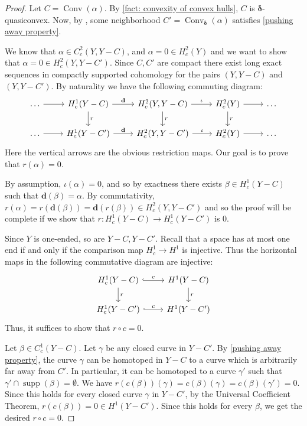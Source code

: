 \documentclass{amsart}
\numberwithin{equation}{section}
\theoremstyle{definition}
\newcommand{\bfd}{\mathbf{d}}
\newcommand{\bdelta}{{\boldsymbol\delta}}
\DeclareMathOperator{\conv}{Conv}
\DeclareMathOperator{\supp}{supp}
\begin{document}
\begin{proof}
Let $C = \conv(\alpha)$. By \ref{fact: convexity of convex hulls}, $C$ is $\bdelta$-quasiconvex. Now, by , some neighborhood $C' = \conv_\bdelta(\alpha)$ satisfies \ref{pushing away property}. 

We know that $\alpha\in C^2_c(Y,Y-C)$, and $\alpha =0 \in H^2_c(Y)$ and we want to show that $\alpha = 0\in H^2_c(Y,Y-C')$. 
Since $C,C'$ are compact there exist long exact sequences in compactly supported cohomology for the pairs $(Y,Y-C)$ and $(Y,Y-C')$. By naturality we have the following commuting diagram:
\begin{equation}
    \begin{tikzcd}
   \dots  \arrow[r] & H^1_c(Y-C) \arrow[r,"\bfd"]\arrow[d,"r"] &H^2_c(Y,Y-C) \arrow[r,"\iota"]\arrow[d,"r"] &H^2_c(Y) \arrow[r]\arrow[d,"r"] &\dots\\
   \dots  \arrow[r] & H^1_c(Y-C') \arrow[r,"\bfd"] &H^2_c(Y,Y-C') \arrow[r,"\iota"] &H^2_c(Y) \arrow[r] &\dots
\end{tikzcd}
\end{equation}
Here the vertical arrows are the obvious restriction maps. 
Our goal is to prove that $r(\alpha)=0$.

By assumption, $\iota(\alpha)=0$, and so by exactness there exists $\beta\in H^1_c(Y-C)$ such that $\bfd(\beta)=\alpha$. By commutativity, 
$r(\alpha) = r(\bfd (\beta)) = \bfd (r (\beta)) \in H^2_c(Y,Y-C')$
and so the proof will be complete if we show that $r:H^1_c(Y-C) \to H^1_c(Y-C')$ is $0$.

Since $Y$ is one-ended, so are $Y-C, Y-C'$. Recall that a space has at most one end if and only if the comparison map $H^1_c \to H^1$ is injective. 
Thus the horizontal maps in the following commutative diagram are injective:
\begin{equation}
    \begin{tikzcd}
        H^1_c (Y-C) \arrow[hookrightarrow]{r}{c}\arrow[d,"r"] &H^1(Y-C) \arrow[d,"r"]\\
        H^1_c (Y-C') \arrow[hookrightarrow]{r}{c} &H^1(Y-C') 
    \end{tikzcd}
\end{equation}
Thus, it suffices to show that $r\circ c =0$.

Let $\beta \in C^1_c(Y-C)$. 
Let $\gamma$ be any closed curve in $Y-C'$.
By \ref{pushing away property},  the curve $\gamma$ can be homotoped in $Y-C$ to a curve which is arbitrarily far away from $C'$. In particular, it can be homotoped to a curve $\gamma'$ such that $\gamma'\cap \supp(\beta)=\emptyset$. 
We have $r(c(\beta)) (\gamma) = c(\beta)(\gamma) = c(\beta)(\gamma') = 0$. 
Since this holds for every closed curve $\gamma$ in $Y-C'$, by the Universal Coefficient Theorem, $r(c(\beta)) = 0 \in H^1(Y-C')$. Since this holds for every $\beta$, we get the desired $r\circ c =0$.
\end{proof}
\end{document}
